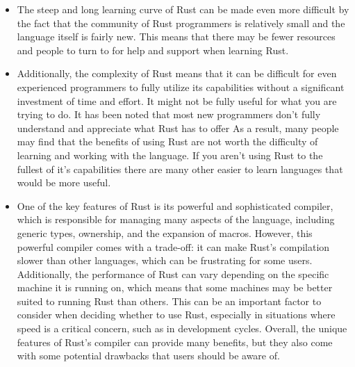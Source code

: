 \documentclass{article}
\theoremstyle{theorem}
\theoremstyle{definition}
\theoremstyle{remark}
\begin{document}
\begin{itemize}
\item The steep and long learning curve of Rust can be made even more difficult by the fact that the community of Rust programmers is relatively small and the language itself is fairly new. This means that there may be fewer resources and people to turn to for help and support when learning Rust. 
\item Additionally, the complexity of Rust means that it can be difficult for even experienced programmers to fully utilize its capabilities without a significant investment of time and effort. It might not be fully useful for what you are trying to do. It has been noted that most new programmers don’t fully understand and appreciate what Rust has to offer As a result, many people may find that the benefits of using Rust are not worth the difficulty of learning and working with the language. If you aren’t using Rust to the fullest of it’s capabilities there are many other easier to learn languages that would be more useful.
\item One of the key features of Rust is its powerful and sophisticated compiler, which is responsible for managing many aspects of the language, including generic types, ownership, and the expansion of macros. However, this powerful compiler comes with a trade-off: it can make Rust's compilation slower than other languages, which can be frustrating for some users. Additionally, the performance of Rust can vary depending on the specific machine it is running on, which means that some machines may be better suited to running Rust than others. This can be an important factor to consider when deciding whether to use Rust, especially in situations where speed is a critical concern, such as in development cycles. Overall, the unique features of Rust's compiler can provide many benefits, but they also come with some potential drawbacks that users should be aware of.
\end{itemize}
\end{document}
